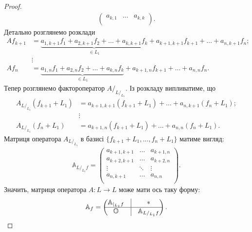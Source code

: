 \documentclass{math_library}
\begin{document}
\begin{proof}
\begin{align*}
\begin{pmatrix}
a_{k,1} & \dots & a_{k,k}\\
\end{pmatrix}.
\end{align*}
Детально розглянемо розклади
\begin{align*}
Af_{k+1} & = \underbrace{a_{1,k+1}f_1 + a_{2,k+1}f_2 + \dots + a_{k,k+1}f_k}_{\in L_1} + a_{k+1,k+1}f_{k+1} + \dots + a_{n,k+1}f_n; \\
& \vdots \\
Af_n & = \underbrace{a_{1,n}f_1 + a_{2,n}f_2 + \dots + a_{k,n}f_k}_{\in L_1} + a_{k+1,n}f_{k+1} + \dots + a_{n,n}f_n.
\end{align*}
Тепер розглянемо фактороператор $A/_{L/_{L_1}}$. Із розкладу випливатиме, що
\begin{align*}
A_{L/_{L_1}}(f_{k+1} + L_1) & = a_{k+1,k+1}(f_{k+1}+L_1) + \dots + a_{n,k+1}(f_n+L_1); \\
& \vdots \\
A_{L/_{L_1}}(f_{n} + L_1) & = a_{k+1,n}(f_{k+1}+L_1) + \dots + a_{n,n}(f_n + L_1).
\end{align*}
Матриця оператора $A_{L/_{L_1}}$ в базисі $\{f_{k+1}+L_1,\dots,f_n+L_1\}$ матиме вигляд:
\begin{align*}
\mathbb{A}_{L/_{L_1} f} = \begin{pmatrix}
a_{k+1,k+1} & \dots & a_{k+1, n} \\
a_{k+2,k+1} &  \dots & a_{k+2, n} \\
\vdots & \ddots & \vdots \\
a_{n,k+1} & \dots & a_{n, n} \\
\end{pmatrix}.
\end{align*}
Значить, матриця оператора $A \colon L \to L$ може мати ось таку форму:
\[
\mathbb{A}_f = \begin{pmatrix}
 \mathbb{A}_{|_{L_1}f}  & \vline & * \\
 \hline
 \mathbb{O} & \vline & \mathbb{A}_{L/_{L_1} f}
\end{pmatrix}. \qedhere
\]
\end{proof}

\end{document}
